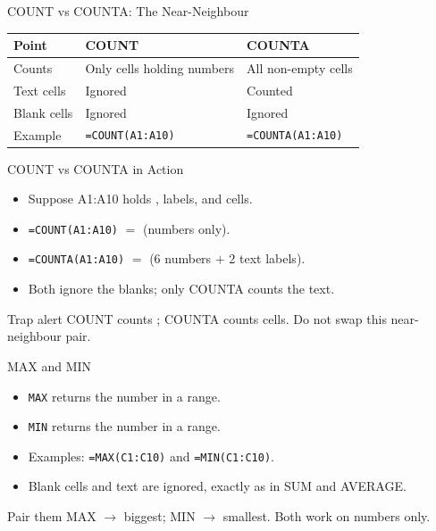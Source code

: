 \documentclass[aspectratio=169]{beamer}
\begin{document}
\begin{frame}{COUNT vs COUNTA: The Near-Neighbour}
  \begin{center}
    \begin{tabular}{p{}p{}p{}}
      \toprule
      \textbf{Point} & \textbf{COUNT} & \textbf{COUNTA} \\
      \midrule
      Counts & Only cells holding numbers & All non-empty cells \\
      Text cells & Ignored & Counted \\
      Blank cells & Ignored & Ignored \\
      Example & \texttt{=COUNT(A1:A10)} & \texttt{=COUNTA(A1:A10)} \\
      \bottomrule
    \end{tabular}
  \end{center}
  \vspace{0.2cm}
\end{frame}

\begin{frame}{COUNT vs COUNTA in Action}
  \begin{itemize}
    \item Suppose A1:A10 holds ,  labels, and
       cells.
    \item \texttt{=COUNT(A1:A10)} $=$  (numbers only).
    \item \texttt{=COUNTA(A1:A10)} $=$  (6 numbers $+$ 2 text
      labels).
    \item Both ignore the blanks; only COUNTA counts the text.
  \end{itemize}
  \begin{alertblock}{Trap alert}
    COUNT counts ; COUNTA counts  cells.
    Do not swap this near-neighbour pair.
  \end{alertblock}
\end{frame}

\begin{frame}{MAX and MIN}
  \begin{itemize}
    \item \texttt{MAX} returns the  number in a range.
    \item \texttt{MIN} returns the  number in a range.
    \item Examples: \texttt{=MAX(C1:C10)} and \texttt{=MIN(C1:C10)}.
    \item Blank cells and text are ignored, exactly as in SUM and AVERAGE.
  \end{itemize}
  \begin{block}{Pair them}
    MAX $\rightarrow$ biggest; MIN $\rightarrow$ smallest. Both work on
    numbers only.
  \end{block}
\end{frame}
\end{document}
